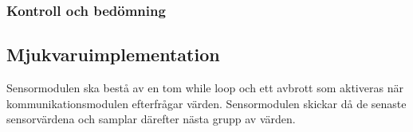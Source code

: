 \documentclass[designspec/spec.tex]{subfiles}
\begin{document}
\subsubsection{Kontroll och bedömning}

\subsection{Mjukvaruimplementation} 
Sensormodulen ska bestå av en tom while loop och ett avbrott som aktiveras när
kommunikationsmodulen efterfrågar värden. Sensormodulen skickar då de senaste
sensorvärdena och samplar därefter nästa grupp av värden.
\end{document}
